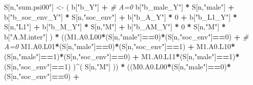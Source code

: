 \documentclass[
]{book}
\newenvironment{Shaded}{\begin{snugshade}}{\end{snugshade}}
\newcommand{\CommentTok}[1]{\textcolor[rgb]{0.56,0.35,0.01}{\textit{#1}}}
\newcommand{\DecValTok}[1]{\textcolor[rgb]{0.00,0.00,0.81}{#1}}
\newcommand{\NormalTok}[1]{#1}
\newcommand{\OtherTok}[1]{\textcolor[rgb]{0.56,0.35,0.01}{#1}}
\newcommand{\SpecialCharTok}[1]{\textcolor[rgb]{0.81,0.36,0.00}{\textbf{#1}}}
\newcommand{\StringTok}[1]{\textcolor[rgb]{0.31,0.60,0.02}{#1}}
\begin{document}
\begin{Shaded}
\begin{Highlighting}[]
\NormalTok{    S[n,}\StringTok{"sum.psi00"}\NormalTok{] }\OtherTok{\textless{}{-}}\NormalTok{  ( b[}\StringTok{"b\_Y"}\NormalTok{] }\SpecialCharTok{+}                                           \CommentTok{\# A=0}
\NormalTok{                             b[}\StringTok{"b\_male\_Y"}\NormalTok{] }\SpecialCharTok{*}\NormalTok{ S[n,}\StringTok{"male"}\NormalTok{] }\SpecialCharTok{+} 
\NormalTok{                             b[}\StringTok{"b\_soc\_env\_Y"}\NormalTok{] }\SpecialCharTok{*}\NormalTok{ S[n,}\StringTok{"soc\_env"}\NormalTok{] }\SpecialCharTok{+} 
\NormalTok{                             b[}\StringTok{"b\_A\_Y"}\NormalTok{] }\SpecialCharTok{*} \DecValTok{0} \SpecialCharTok{+} 
\NormalTok{                             b[}\StringTok{"b\_L1\_Y"}\NormalTok{] }\SpecialCharTok{*}\NormalTok{ S[n,}\StringTok{"L1"}\NormalTok{] }\SpecialCharTok{+}
\NormalTok{                             b[}\StringTok{"b\_M\_Y"}\NormalTok{] }\SpecialCharTok{*}\NormalTok{ S[n,}\StringTok{"M"}\NormalTok{] }\SpecialCharTok{+}
\NormalTok{                             b[}\StringTok{"b\_AM\_Y"}\NormalTok{] }\SpecialCharTok{*} \DecValTok{0} \SpecialCharTok{*}\NormalTok{ S[n,}\StringTok{"M"}\NormalTok{] }\SpecialCharTok{*}\NormalTok{ b[}\StringTok{"A.M.inter"}\NormalTok{] ) }\SpecialCharTok{*}
\NormalTok{      ((M1.A0.L00}\SpecialCharTok{*}\NormalTok{(S[n,}\StringTok{"male"}\NormalTok{]}\SpecialCharTok{==}\DecValTok{0}\NormalTok{)}\SpecialCharTok{*}\NormalTok{(S[n,}\StringTok{"soc\_env"}\NormalTok{]}\SpecialCharTok{==}\DecValTok{0}\NormalTok{) }\SpecialCharTok{+}                    \CommentTok{\# A\textquotesingle{}=0}
\NormalTok{          M1.A0.L01}\SpecialCharTok{*}\NormalTok{(S[n,}\StringTok{"male"}\NormalTok{]}\SpecialCharTok{==}\DecValTok{0}\NormalTok{)}\SpecialCharTok{*}\NormalTok{(S[n,}\StringTok{"soc\_env"}\NormalTok{]}\SpecialCharTok{==}\DecValTok{1}\NormalTok{) }\SpecialCharTok{+}
\NormalTok{          M1.A0.L10}\SpecialCharTok{*}\NormalTok{(S[n,}\StringTok{"male"}\NormalTok{]}\SpecialCharTok{==}\DecValTok{1}\NormalTok{)}\SpecialCharTok{*}\NormalTok{(S[n,}\StringTok{"soc\_env"}\NormalTok{]}\SpecialCharTok{==}\DecValTok{0}\NormalTok{) }\SpecialCharTok{+} 
\NormalTok{          M1.A0.L11}\SpecialCharTok{*}\NormalTok{(S[n,}\StringTok{"male"}\NormalTok{]}\SpecialCharTok{==}\DecValTok{1}\NormalTok{)}\SpecialCharTok{*}\NormalTok{(S[n,}\StringTok{"soc\_env"}\NormalTok{]}\SpecialCharTok{==}\DecValTok{1}\NormalTok{) )}\SpecialCharTok{\^{}}\NormalTok{( S[n,}\StringTok{"M"}\NormalTok{] )) }\SpecialCharTok{*}
\NormalTok{      ((M0.A0.L00}\SpecialCharTok{*}\NormalTok{(S[n,}\StringTok{"male"}\NormalTok{]}\SpecialCharTok{==}\DecValTok{0}\NormalTok{)}\SpecialCharTok{*}\NormalTok{(S[n,}\StringTok{"soc\_env"}\NormalTok{]}\SpecialCharTok{==}\DecValTok{0}\NormalTok{) }\SpecialCharTok{+}                

\end{Highlighting}
\end{Shaded}
\end{document}
